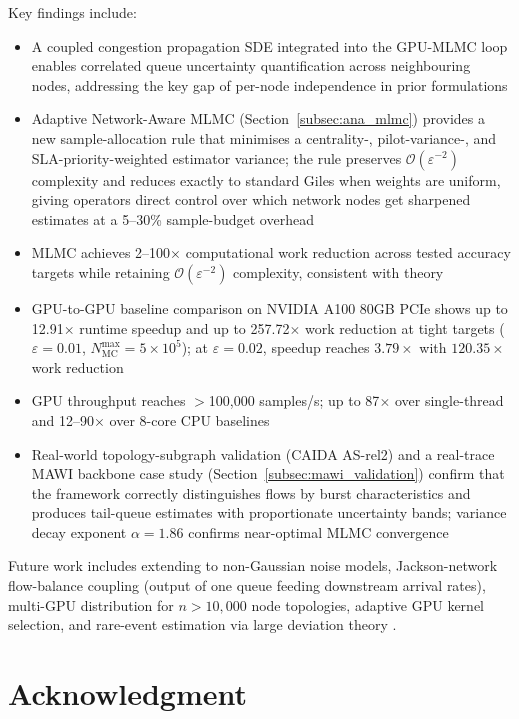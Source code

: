 \documentclass{ieeeaccess}
\begin{document}
Key findings include:
\begin{itemize}
    \item A coupled congestion propagation SDE integrated into the GPU-MLMC loop enables
    correlated queue uncertainty quantification across neighbouring nodes, addressing the key gap
    of per-node independence in prior formulations
    \item Adaptive Network-Aware MLMC (Section~\ref{subsec:ana_mlmc}) provides a new
    sample-allocation rule that minimises a centrality-, pilot-variance-, and
    SLA-priority-weighted estimator variance; the rule preserves $\mathcal{O}(\varepsilon^{-2})$
    complexity and reduces exactly to standard Giles when weights are uniform, giving operators
    direct control over which network nodes get sharpened estimates at a 5--30\% sample-budget
    overhead
    \item MLMC achieves 2--100$\times$ computational work reduction across tested accuracy
    targets while retaining $\mathcal{O}(\varepsilon^{-2})$ complexity, consistent with theory
    \cite{giles2015multilevel}
    \item GPU-to-GPU baseline comparison on NVIDIA A100 80GB PCIe shows up to 12.91$\times$
    runtime speedup and up to 257.72$\times$ work reduction at tight targets ($\varepsilon=0.01$,
    $N_\text{MC}^\text{max}=5\times10^5$); at $\varepsilon=0.02$, speedup reaches $3.79\times$
    with $120.35\times$ work reduction
    \item GPU throughput reaches $>$100,000 samples/s; up to 87$\times$ over single-thread and
    12--90$\times$ over 8-core CPU baselines
    \item Real-world topology-subgraph validation (CAIDA AS-rel2) and a real-trace MAWI backbone
    case study (Section~\ref{subsec:mawi_validation}) confirm that the framework correctly
    distinguishes flows by burst characteristics and produces tail-queue estimates with
    proportionate uncertainty bands; variance decay exponent $\alpha = 1.86$ confirms near-optimal
    MLMC convergence
\end{itemize}

Future work includes extending to non-Gaussian noise models, Jackson-network flow-balance
coupling (output of one queue feeding downstream arrival rates), multi-GPU distribution for
$n > 10{,}000$ node topologies, adaptive GPU kernel selection, and rare-event estimation via
large deviation theory \cite{chatterjee2017}.

\section*{Acknowledgment}
\end{document}
